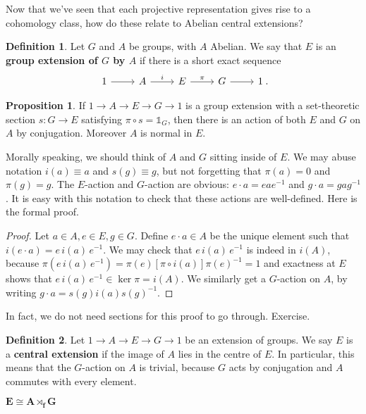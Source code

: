 \documentclass[10pt]{article}
\newcommand{\iden}{\mathds{1}}
\theoremstyle{plain}
\theoremstyle{definition}
\newtheorem{defn}{Definition}
\newtheorem{prop}{Proposition}
\theoremstyle{remark}
\begin{document}
Now that we've seen that each projective representation gives rise to
a cohomology class, how do these relate to Abelian central extensions?

\begin{defn}
    Let $G$ and $A$ be groups, with $A$ Abelian. We say that $E$ is an
    \textbf{group extension of $G$ by $A$} if there is a short exact sequence
    \[ \begin{tikzcd} 1\arrow[r] &A\arrow[r,"i"] &E\arrow[r,"\pi"] &G\arrow[r] &1
    \end{tikzcd}\!.\]
\end{defn}
\begin{prop} If $1\to A\to E\to G\to 1$ is a group extension with a
    set-theoretic section $s:G\to E$ satisfying $\pi\circ s =
    \iden_G$, then there is an action of both $E$ and $G$ on $A$ by
    conjugation. Moreover $A$ is normal in $E$.  
\end{prop}
Morally speaking, we should think of $A$ and $G$ sitting inside of
$E$. We may abuse notation $i(a) \equiv a$ and $s(g) \equiv g$, but
not forgetting that $\pi(a) = 0$ and $\pi(g) = g$.  The $E$-action and
$G$-action are obvious: $e\cdot a = eae^{-1}$ and $g\cdot a=gag^{-1}$. 
It is easy with this notation to check that these actions are
well-defined. Here is the formal proof.
\begin{proof}
    Let $a\in A, e\in E, g\in G$. Define $e\cdot a \in A$ be the
    unique element such that $i(e\cdot a) = e\,i(a)\,e^{-1}$.  We may
    check that $e\,i(a)\,e^{-1}$ is indeed in $i(A)$, because
    $\pi(e\,i(a)\,e^{-1}) = \pi(e)[\pi\circ i(a)]\pi(e)^{-1} = 1$ and
    exactness at $E$ shows that $e\,i(a)\,e^{-1}\in \ker\pi = i(A)$.
    We similarly get a $G$-action on $A$, by writing $g\cdot a =
    s(g)i(a)s(g)^{-1}$.  
\end{proof}
In fact, we do not need sections for this proof to go through. Exercise.

\begin{defn}
    Let $1\to A\to E\to G\to 1$ be an extension of groups. We say
    $E$ is a \textbf{central extension} if the image of $A$ lies in
    the centre of $E$. In particular, this means that the $G$-action
    on $A$ is trivial, because $G$ acts by conjugation and $A$
    commutes with every element.
\end{defn}

\begin{center} $\bm{ E \cong A\rtimes_f G }$ \end{center}
\end{document}
